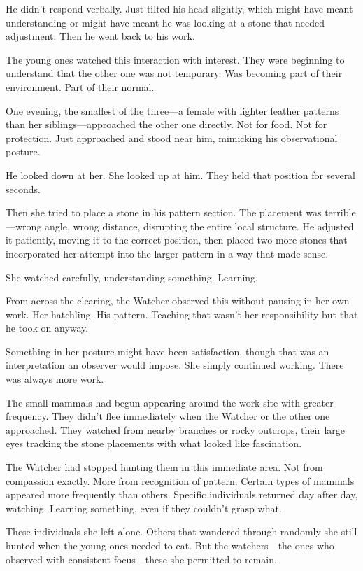 He didn't respond verbally. Just tilted his head slightly, which might have meant understanding or might have meant he was looking at a stone that needed adjustment. Then he went back to his work.

The young ones watched this interaction with interest. They were beginning to understand that the other one was not temporary. Was becoming part of their environment. Part of their normal.

One evening, the smallest of the three—a female with lighter feather patterns than her siblings—approached the other one directly. Not for food. Not for protection. Just approached and stood near him, mimicking his observational posture.

He looked down at her. She looked up at him. They held that position for several seconds.

Then she tried to place a stone in his pattern section. The placement was terrible—wrong angle, wrong distance, disrupting the entire local structure. He adjusted it patiently, moving it to the correct position, then placed two more stones that incorporated her attempt into the larger pattern in a way that made sense.

She watched carefully, understanding something. Learning.

From across the clearing, the Watcher observed this without pausing in her own work. Her hatchling. His pattern. Teaching that wasn't her responsibility but that he took on anyway.

Something in her posture might have been satisfaction, though that was an interpretation an observer would impose. She simply continued working. There was always more work.

\scenebreak

The small mammals had begun appearing around the work site with greater frequency. They didn't flee immediately when the Watcher or the other one approached. They watched from nearby branches or rocky outcrops, their large eyes tracking the stone placements with what looked like fascination.

The Watcher had stopped hunting them in this immediate area. Not from compassion exactly. More from recognition of pattern. Certain types of mammals appeared more frequently than others. Specific individuals returned day after day, watching. Learning something, even if they couldn't grasp what.

These individuals she left alone. Others that wandered through randomly she still hunted when the young ones needed to eat. But the watchers—the ones who observed with consistent focus—these she permitted to remain.

